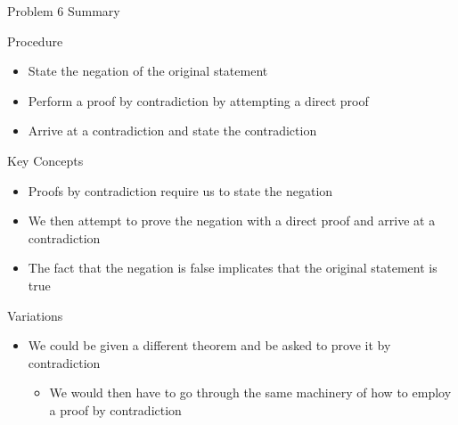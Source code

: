 \begin{summary}{Problem 6 Summary}
    \begin{statement}{Procedure}
        \begin{itemize}
            \item State the negation of the original statement
            \item Perform a proof by contradiction by attempting a direct proof
            \item Arrive at a contradiction and state the contradiction
        \end{itemize}
    \end{statement}
    \begin{statement}{Key Concepts}
        \begin{itemize}
            \item Proofs by contradiction require us to state the negation
            \item We then attempt to prove the negation with a direct proof and arrive at a contradiction
            \item The fact that the negation is false implicates that the original statement is true
        \end{itemize}
    \end{statement}
    \begin{statement}{Variations}
        \begin{itemize}
            \item We could be given a different theorem and be asked to prove it by contradiction
            \begin{itemize}
                \item We would then have to go through the same machinery of how to employ a proof by contradiction
            \end{itemize}
        \end{itemize}
    \end{statement}
\end{summary}

